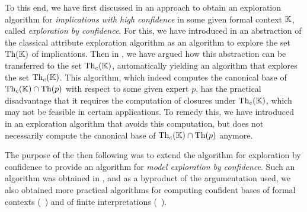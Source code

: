 To this end, we have first discussed in  an approach to obtain an
exploration algorithm for \emph{implications with high confidence} in some given formal
context ${\mathbb{K}}$, called \emph{exploration by confidence}.  For this, we have introduced
in  an abstraction of the classical attribute exploration
algorithm as an algorithm to explore the set $\operatorname{Th}({\mathbb{K}})$ of implications.  Then in
, we have argued how this abstraction can be transferred to the set
$\operatorname{Th}_{c}({\mathbb{K}})$, automatically yielding an algorithm that explores the set $\operatorname{Th}_{c}({\mathbb{K}})$.  This algorithm, which indeed computes the canonical base of $\operatorname{Th}_{c}({\mathbb{K}}) \cap
\operatorname{Th}(p)$ with respect to some given expert $p$, has the practical disadvantage that it
requires the computation of closures under $\operatorname{Th}_{c}({\mathbb{K}})$, which may not be feasible in
certain applications.  To remedy this, we have introduced in  an
exploration algorithm that avoids this computation, but does not necessarily compute the
canonical base of $\operatorname{Th}_{c}({\mathbb{K}}) \cap \operatorname{Th}(p)$ anymore.

The purpose of the then following  was to extend the algorithm
for exploration by confidence to provide an algorithm for \emph{model exploration by
  confidence}.  Such an algorithm was obtained in , and as a
byproduct of the argumentation used, we also obtained more practical algorithms for
computing confident bases of formal contexts (~) and of finite
interpretations (~).







